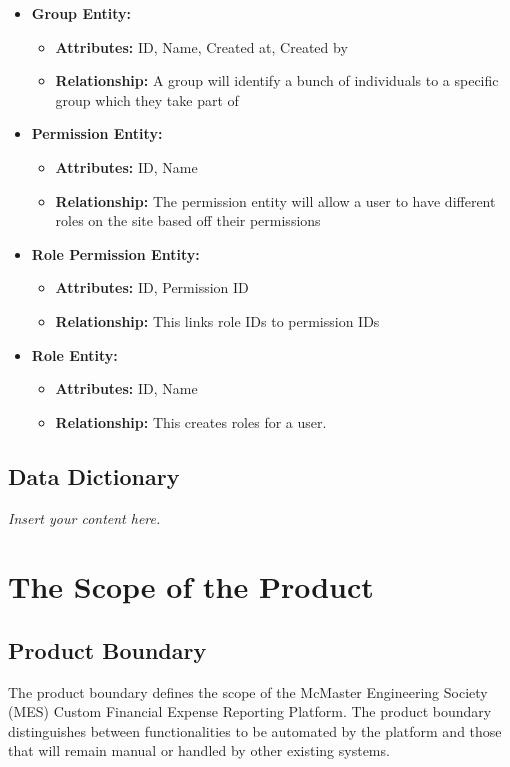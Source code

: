 \documentclass[12pt]{article}
\newcommand{\lips}{\textit{Insert your content here.}}
\begin{document}
\begin{itemize}
    \item \textbf{Group Entity:}
    \begin{itemize}
        \item \textbf{Attributes:} ID, Name, Created at, Created by
        \item \textbf{Relationship:} A group will identify a bunch of individuals to a specific group which they take part of 
    \end{itemize}
    
    \item \textbf{Permission Entity:}
    \begin{itemize}
        \item \textbf{Attributes:} ID, Name
        \item \textbf{Relationship:} The permission entity will allow a user to have different roles on the site based off their permissions
    \end{itemize}

    \item \textbf{Role Permission Entity:}
    \begin{itemize}
        \item \textbf{Attributes:} ID, Permission ID
        \item \textbf{Relationship:} This links role IDs to permission IDs
    \end{itemize}

    \item \textbf{Role Entity:}
    \begin{itemize}
        \item \textbf{Attributes:} ID, Name
        \item \textbf{Relationship:} This creates roles for a user.
    \end{itemize}

\end{itemize}

\subsection{Data Dictionary}
\lips

\section{The Scope of the Product}

\subsection{Product Boundary}
The product boundary defines the scope of the McMaster Engineering Society (MES) Custom Financial Expense Reporting Platform. The product boundary distinguishes between functionalities to be automated by the platform and those that will remain manual or handled by other existing systems.
\end{document}
